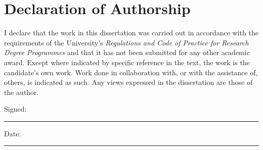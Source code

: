 \chapter*{Declaration of Authorship}

I declare that the work in this dissertation was carried out in accordance with the 
requirements of the University's \emph{Regulations and Code of Practice for Research Degree Programmes}
and that it has not been submitted for any other academic award. 
Except where indicated by specific reference in the text, the work is the candidate's own work. 
Work done in collaboration with, or with the assistance of, others, is indicated as such. 
Any views expressed in the dissertation are those of the author.

\vspace{1.5cm}
Signed: 
\begin{center}
    \rule{12cm}{0.25mm}
\end{center}

\vspace{1.5cm}
Date: 
\begin{center}
    \rule{12cm}{0.25mm}
\end{center}

